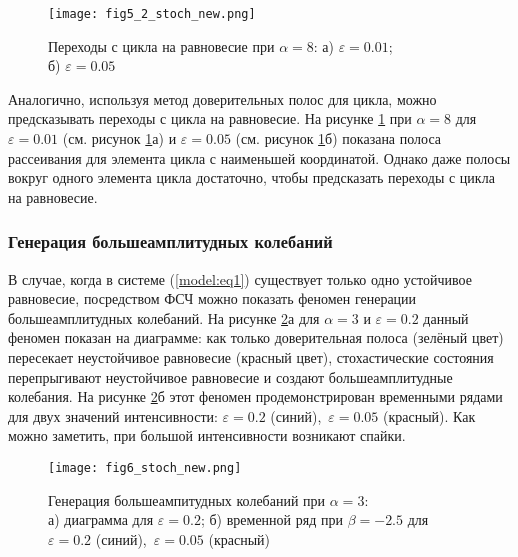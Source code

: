 \documentclass[a4paper, 14pt]{extreport}
\numberwithin{equation}{section}
\numberwithin{figure}{section}
\numberwithin{table}{section}
\begin{document}
				\begin{figure}[h!]
					\begin{center}
						\texttt{[image: fig5\_2\_stoch\_new.png]}
					\end{center}
					\caption{Переходы с цикла на равновесие при $ \alpha = 8 $: а) $ \varepsilon = 0.01 $; \\ б) $ \varepsilon = 0.05 $}
					\label{fig5_2_stoch}		
				\end{figure} %
                Аналогично, используя метод доверительных полос для цикла, можно предсказывать переходы с цикла на равновесие. На рисунке \ref{fig5_2_stoch} при $ \alpha = 8 $ для $ \varepsilon = 0.01 $ (см. рисунок \ref{fig5_2_stoch}а) и $ \varepsilon = 0.05 $ (см. рисунок \ref{fig5_2_stoch}б) показана полоса рассеивания для элемента цикла с наименьшей координатой. Однако даже полосы вокруг одного элемента цикла достаточно, чтобы предсказать переходы с цикла на равновесие.
			

			\subsubsection{Генерация большеамплитудных колебаний}
			\label{stoch_fluc}
				В случае, когда в системе (\ref{model:eq1}) существует только одно устойчивое равновесие, посредством ФСЧ можно показать феномен генерации большеамплитудных колебаний. На рисунке \ref{fig6_stoch}а для $ \alpha = 3 $ и $ \varepsilon = 0.2 $ данный феномен показан на диаграмме: как только доверительная полоса (зелёный цвет) пересекает неустойчивое равновесие (красный цвет), стохастические состояния перепрыгивают неустойчивое равновесие и создают большеамплитудные колебания. На рисунке \ref{fig6_stoch}б этот феномен продемонстрирован временными рядами для двух значений интенсивности: $ \varepsilon = 0.2 $ (синий),~$ \varepsilon = 0.05 $ (красный). Как можно заметить, при большой интенсивности возникают спайки.
				\begin{figure}[h!]
					\begin{center}
						\texttt{[image: fig6\_stoch\_new.png]}
					\end{center}
					\caption{Генерация большеампитудных колебаний при $ \alpha = 3 $: \\ а) диаграмма для $ \varepsilon = 0.2 $; б) временной ряд при $ \beta = -2.5 $ для $ \varepsilon = 0.2 $ (синий),~$ \varepsilon = 0.05 $ (красный)}
					\label{fig6_stoch}		
				\end{figure}
			
\end{document}
